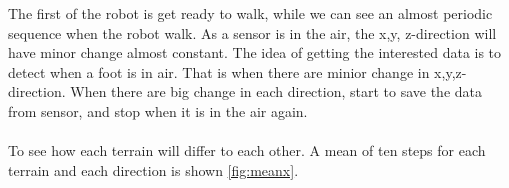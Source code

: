 \documentclass[USenglish]{ifimaster}  %
\begin{document}
\FloatBarrier
The first of the robot is get ready to walk, while we can see an almost periodic sequence when the robot walk. As a sensor is in the air, the x,y, z-direction will have minor change almost constant. The idea of getting the interested data is to detect when a foot is in air. That is when there are minior change in x,y,z-direction. When there are big change in each direction, start to save the data from sensor, and stop when it is in the air again. 
\\
\\
To see how each terrain will differ to each other. A mean of ten steps for each terrain and each direction is shown \ref{fig:meanx}.

\end{document}
